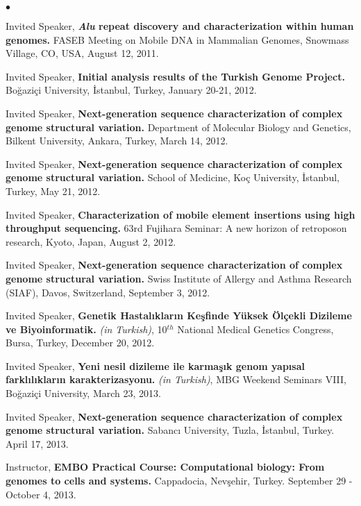 \documentclass[margin,line]{res}
\newenvironment{list2}{
  \begin{list}{$\bullet$}{%
      \setlength{\itemsep}{0in}
      \setlength{\parsep}{0in} \setlength{\parskip}{0in}
      \setlength{\topsep}{0in} \setlength{\partopsep}{0in} 
      \setlength{\leftmargin}{0.2in}}}{\end{list}}
\begin{document}
\begin{resume}
\begin{list2}
\item
  Invited Speaker, 
  {\bf {\it Alu} repeat discovery and characterization within human genomes.}
  FASEB Meeting on Mobile DNA in Mammalian Genomes, Snowmass Village, CO, USA, August 12, 2011.

\item
  Invited Speaker,
  {\bf Initial analysis results of the Turkish Genome Project.} 
Bo\u{g}azi\c{c}i University, \.{I}stanbul, Turkey, January 20-21, 2012.

\item
  Invited Speaker, 
  {\bf  Next-generation sequence characterization of complex genome structural variation.}
  Department of Molecular Biology and Genetics, Bilkent University, Ankara, Turkey, March 14, 2012.

\item
  Invited Speaker, 
  {\bf  Next-generation sequence characterization of complex genome structural variation.}
  School of Medicine, Ko\c{c} University, \.{I}stanbul, Turkey, May 21, 2012.
\item
  Invited Speaker, 
  {\bf Characterization of mobile element insertions using high throughput sequencing.}
  63rd Fujihara Seminar: A new horizon of retroposon research, Kyoto, Japan, August 2, 2012.

\item
  Invited Speaker, 
  {\bf  Next-generation sequence characterization of complex genome structural variation.}
  Swiss Institute of Allergy and Asthma Research (SIAF), Davos, Switzerland, September 3, 2012.
\item
  Invited Speaker, 
  {\bf Genetik Hastalıkların Keşfinde Yüksek Ölçekli Dizileme ve Biyoinformatik.} {\it (in Turkish)},
  10$^{th}$ National Medical Genetics Congress, Bursa, Turkey,  December 20, 2012.
\item
  Invited Speaker, 
  {\bf Yeni nesil dizileme ile karmaşık genom yapısal farklılıkların karakterizasyonu.} {\it (in Turkish)},
  MBG Weekend Seminars VIII, Boğaziçi University, March 23, 2013.  
\item
  Invited Speaker, 
  {\bf  Next-generation sequence characterization of complex genome structural variation.}
  Sabancı University, Tuzla, İstanbul, Turkey. April 17, 2013.
\item 
  Instructor,
  {\bf EMBO Practical Course: Computational biology: From genomes to cells and systems.}
  Cappadocia, Nevşehir, Turkey. September 29 - October 4, 2013.


\end{list2}
\end{resume}
\end{document}
